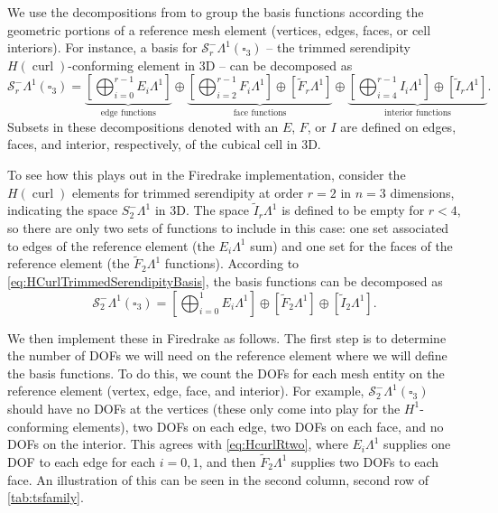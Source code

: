 \documentclass[format=acmsmall,screen,timestamp=false,a4paper]{acmart}
\DeclareMathOperator{\curl}{curl}
\newcommand{\calS}{\mathcal{S}}
\newcommand{\hcurl}{\ensuremath{{H}(\curl)}\xspace}
\begin{document}
  
  
We use the decompositions from \citet{gillette2019computational} to group the basis functions according the geometric portions of a reference mesh element (vertices, edges, faces, or cell interiors).  For instance, a basis for $\calS^-_r\Lambda^1(\square_3)$ -- the trimmed serendipity \hcurl-conforming element in 3D -- can be decomposed as
   \begin{equation}\label{eq:HCurlTrimmedSerendipityBasis}
   \calS^-_r\Lambda^1(\square_3) =   \underbrace{\left[\bigoplus_{i=0}^{r-1} E_i \Lambda^1\right]}_{\text{edge functions}}\oplus\underbrace{\left[ \bigoplus_{i=2}^{r-1}F_i \Lambda^1\right] \oplus \left[\tilde{F}_r \Lambda^1\right]}_{\text{face functions}}\oplus\underbrace{\left[ \bigoplus_{i=4}^{r-1}I_i \Lambda^1 \right] \oplus \left[\tilde{I}_r \Lambda^1\right]}_{\text{interior functions}}.
   \end{equation}
  Subsets in these decompositions denoted with an $E$, $F$, or $I$ are defined on edges, faces, and interior, respectively, of the cubical cell in 3D.

To see how this plays out in the Firedrake implementation, consider the \hcurl elements for trimmed serendipity at order $r=2$ in $n=3$ dimensions, indicating the space $S_2^- \Lambda^1$ in 3D.
The space $\tilde{I}_r \Lambda^1$ is defined to be empty for $r<4$, so there are only two sets of functions to include in this case: one set associated to edges of the reference element (the $E_i\Lambda^1$ sum) and one set for the faces of the reference element (the $\tilde{F}_2\Lambda^1$ functions).
According to \cref{eq:HCurlTrimmedSerendipityBasis}, the basis functions can be decomposed as
\begin{equation}\label{eq:HcurlRtwo}
   \calS^-_2\Lambda^1(\square_3) =    \left[\bigoplus_{i=0}^{1} E_i \Lambda^1\right] \oplus \left[\tilde{F}_2 \Lambda^1\right]\oplus \left[\tilde{I}_2 \Lambda^1\right].
   \end{equation}

We then implement these in Firedrake as follows.  The first step is to determine the number of DOFs we will need on the reference element where we will define the basis functions.  To do this, we count the DOFs for each mesh entity on the reference element (vertex, edge, face, and interior).  For example, $\mathcal{S}_2^- \Lambda^1(\square_3)$ should have no DOFs at the vertices (these only come into play for the $H^1$-conforming elements), two DOFs on each edge, two DOFs on each face, and no DOFs on the interior.  This agrees with \cref{eq:HcurlRtwo}, where $E_i\Lambda^1$ supplies one DOF to each edge for each $i=0, 1$, and then $\tilde{F}_2\Lambda^1$ supplies two DOFs to each face.  An illustration of this can be seen in the second column, second row of \cref{tab:tsfamily}.
\end{document}
